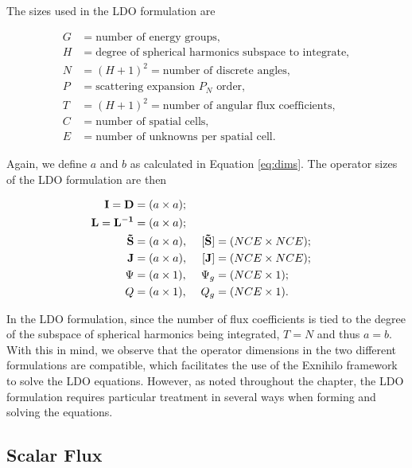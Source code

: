 \noindent The sizes used in the LDO formulation are

\begin{equation*}
  \begin{aligned}
    G &= \text{number of energy groups},\\
    H &= \text{degree of spherical harmonics subspace to integrate},\\
    N &= (H+1)^2 = \text{number of discrete angles},\\
    P &= \text{scattering expansion $P_N$ order},\\
    T &= (H+1)^2 = \text{number of angular flux coefficients},\\
    C &= \text{number of spatial cells},\\
    E &= \text{number of unknowns per spatial cell}.
  \end{aligned}
\end{equation*}

\noindent Again, we define $a$ and $b$ as calculated in Equation \ref{eq:dims}. The
operator sizes of the LDO formulation are then

\begin{alignat*}{3}
\mathbf{I} = \mathbf{D} &=      (a \times a); \\
\mathbf{L} = \mathbf{L^{-1}} &= (a \times a); \\
\mathbf{\tilde{S}} &=      (a \times a),\ &[\mathbf{\tilde{S}}] &= (NCE \times NCE); \\
\mathbf{J} &=              (a \times a),\ &[\mathbf{J}] &= (NCE \times NCE); \\
\Psi &=                (a \times 1),\ &\Psi_g   &= (NCE \times 1); \\
Q &=                   (a \times 1),\ &Q_g      &= (NCE \times 1).
\end{alignat*}

\noindent In the LDO formulation, since the number of flux coefficients is tied to the
degree of the subspace of spherical harmonics being integrated, $T = N$ and thus 
$a = b$. With this in mind, we observe that the operator dimensions in the two 
different formulations are compatible, which facilitates the use of the Exnihilo 
framework to solve the LDO
equations. However, as noted throughout the chapter, the LDO formulation
requires particular treatment in several ways when forming and solving the equations.

\subsection{Scalar Flux}
\label{sec:flux}

